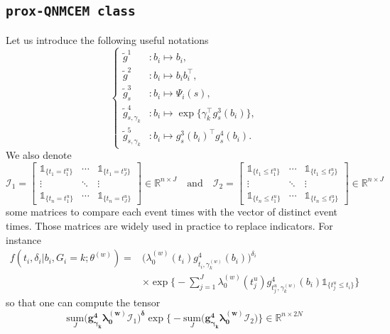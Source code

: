 \documentclass[11pt]{article}
\newcommand{\ind}[1]{\mathds{1}_{#1}}
\newcommand{\cI}{\mathcal I}
\newcommand{\R}{\mathds R}
\begin{document}
\subsection{\texttt{prox-QNMCEM class}}
\label{sec:prox-QNMCEM class}

Let us introduce the following useful notations
\begin{equation*}
  \left\{
    \begin{array}{ll}
    \tilde g^1&: b_i \mapsto b_i,\\
    \tilde g^2&: b_i \mapsto b_ib_i^\top, \\
    \tilde g^3_{s}&: b_i \mapsto \Psi_i(s), \\
    \tilde g^4_{s, \gamma_k}&: b_i \mapsto \exp \big\{\gamma_k^\top g^3_{s}(b_i) \big\}, \\
    \tilde g^5_{s, \gamma_k}&: b_i \mapsto g^3_{s}(b_i)^\top g^4_{s}(b_i).
    \end{array}
  \right. 
\end{equation*}
We also denote 
\[ \cI_1 = 
\begin{bmatrix}
  \ind{\{t_{1} = t_1^u\}}  & \cdots & \ind{\{t_{1} = t_J^u\}}\\
  \vdots &  \ddots & \vdots \\
  \ind{\{t_{n} = t_1^u\}} & \cdots & \ind{\{t_{n} = t_J^u\}}
\end{bmatrix}
\in \R^{n \times J}
\quad \text{and} \quad 
\cI_2 = 
\begin{bmatrix}
  \ind{\{t_{1} \leq t_1^u\}} & \cdots & \ind{\{t_{1} \leq t_J^u\}}\\
  \vdots &  \ddots & \vdots \\
  \ind{\{t_{n} \leq t_1^u\}} & \cdots & \ind{\{t_{n} \leq t_J^u\}}
\end{bmatrix}
\in \R^{n \times J} \]
some matrices to compare each event times with the vector of distinct event times. Those matrices are widely used in practice to replace indicators. For instance
\begin{align*}
f(t_i, \delta_i| b_i, G_i = k ; \theta^{(w)}) = &\big(\lambda_0^{(w)}(t_i) g^4_{t_i, \gamma_k^{(w)}}(b_i) \big)^{\delta_i} \\ 
&\times \exp \Big\{ - \sum_{j=1}^J \lambda_0^{(w)}(t_j^u) g^4_{t_j^u, \gamma_k^{(w)}}(b_i) \ind{\{t_j^u \leq t_i\}} \Big\}
\end{align*}
so that one can compute the tensor
\[ \underset{J}{\text{sum}} \big( \boldsymbol{g^4_{\gamma_k}} \boldsymbol{\lambda_0^{(w)}} \cI_1 \big)^{\boldsymbol{\delta}} \exp \big\{- \underset{J}{\text{sum}} \big(\boldsymbol{g^4_{\gamma_k}} \boldsymbol{\lambda_0^{(w)}} \cI_2 \big) \big\} \in \R^{n \times 2N} \]
\end{document}
